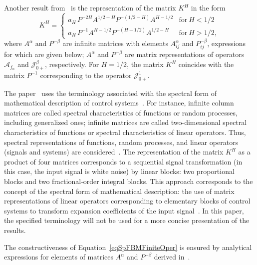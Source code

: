 \documentclass[10pt,reqno]{amsart}
\theoremstyle{plain}
\theoremstyle{remark}
\newcommand{\ca}{\mathcal{A}}
\newcommand{\cj}{\mathcal{J}}
\begin{document}
Another result from~\cite{Ryb_Comp25} is the representation of the matrix $K^H$ in the form
\begin{equation}\label{eqSpFBMFiniteOper}
  K^H = \left\{
    \begin{array}{ll}
      a_H \, P^{-2H} A^{1/2-H} P^{-(1/2-H)} A^{H-1/2} & \text{for} ~ H < 1/2 \\
      a_H \, P^{-1} A^{H-1/2} P^{-(H-1/2)} A^{1/2-H} & \text{for} ~ H > 1/2,
    \end{array}
  \right.
\end{equation}
where $A^\alpha$ and $P^{-\beta}$ are infinite matrices with elements $A_{ij}^\alpha$ and $P_{ij}^{-\beta}$, expressions for which are given below; $A^\alpha$ and $P^{-\beta}$ are matrix representations of operators $\ca_{f_\alpha}$ and $\cj_{0+}^\beta$, respectively. For $H = 1/2$, the matrix $K^H$ coincides with the matrix $P^{-1}$ corresponding to the operator $\cj_{0+}^1$.

The paper~\cite{Ryb_Comp25} uses the terminology associated with the spectral form of mathematical description of control systems~\cite{SolSemPeshNed_79}. For instance, infinite column matrices are called spectral characteristics of functions or random processes, including generalized ones; infinite matrices are called two-dimensional spectral characteristics of functions or spectral characteristics of linear operators. Thus, spectral representations of functions, random processes, and linear operators (signals and systems) are considered~\cite{Ryb_Comp25, Ryb_Math23}. The representation of the matrix $K^H$ as a product of four matrices corresponds to a sequential signal transformation (in this case, the input signal is white noise) by linear blocks: two proportional blocks and two fractional-order integral blocks. This approach corresponds to the concept of the spectral form of mathematical description: the use of matrix representations of linear operators corresponding to elementary blocks of control systems to transform expansion coefficients of the input signal~\cite{SolSemPeshNed_79}. In this paper, the specified terminology will not be used for a more concise presentation of the results.

The constructiveness of Equation~\eqref{eqSpFBMFiniteOper} is ensured by analytical expressions for elements of matrices $A^\alpha$ and $P^{-\beta}$ derived in~\cite{Ryb_Comp25}.
\end{document}
